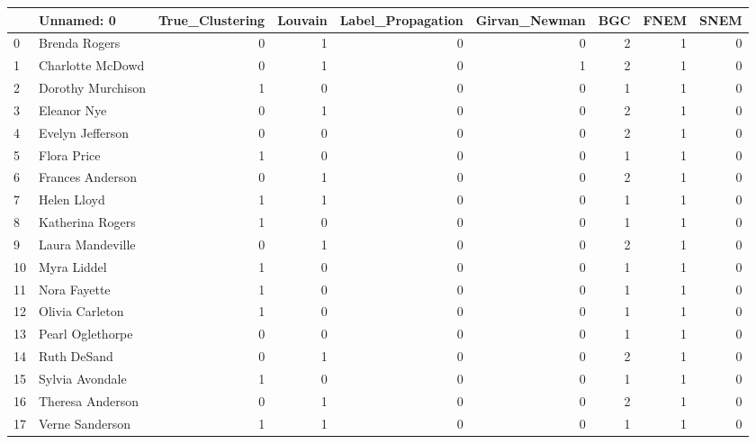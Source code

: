 \begin{tabular}{llrrrrrrr}
\toprule
 & Unnamed: 0 & True_Clustering & Louvain & Label_Propagation & Girvan_Newman & BGC & FNEM & SNEM \\
\midrule
0 & Brenda Rogers & 0 & 1 & 0 & 0 & 2 & 1 & 0 \\
1 & Charlotte McDowd & 0 & 1 & 0 & 1 & 2 & 1 & 0 \\
2 & Dorothy Murchison & 1 & 0 & 0 & 0 & 1 & 1 & 0 \\
3 & Eleanor Nye & 0 & 1 & 0 & 0 & 2 & 1 & 0 \\
4 & Evelyn Jefferson & 0 & 0 & 0 & 0 & 2 & 1 & 0 \\
5 & Flora Price & 1 & 0 & 0 & 0 & 1 & 1 & 0 \\
6 & Frances Anderson & 0 & 1 & 0 & 0 & 2 & 1 & 0 \\
7 & Helen Lloyd & 1 & 1 & 0 & 0 & 1 & 1 & 0 \\
8 & Katherina Rogers & 1 & 0 & 0 & 0 & 1 & 1 & 0 \\
9 & Laura Mandeville & 0 & 1 & 0 & 0 & 2 & 1 & 0 \\
10 & Myra Liddel & 1 & 0 & 0 & 0 & 1 & 1 & 0 \\
11 & Nora Fayette & 1 & 0 & 0 & 0 & 1 & 1 & 0 \\
12 & Olivia Carleton & 1 & 0 & 0 & 0 & 1 & 1 & 0 \\
13 & Pearl Oglethorpe & 0 & 0 & 0 & 0 & 1 & 1 & 0 \\
14 & Ruth DeSand & 0 & 1 & 0 & 0 & 2 & 1 & 0 \\
15 & Sylvia Avondale & 1 & 0 & 0 & 0 & 1 & 1 & 0 \\
16 & Theresa Anderson & 0 & 1 & 0 & 0 & 2 & 1 & 0 \\
17 & Verne Sanderson & 1 & 1 & 0 & 0 & 1 & 1 & 0 \\
\bottomrule
\end{tabular}

